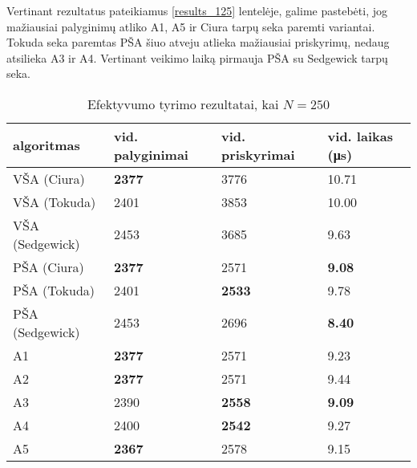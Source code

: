 \documentclass{VUMIFInfKursinis}
\begin{document}
Vertinant rezultatus pateikiamus \ref{results_125} lentelėje, galime pastebėti, jog
mažiausiai palyginimų atliko A1, A5 ir Ciura tarpų seka paremti variantai.
Tokuda seka paremtas PŠA šiuo atveju atlieka mažiausiai priskyrimų, nedaug atsilieka A3 ir A4.
Vertinant veikimo laiką pirmauja PŠA su Sedgewick tarpų seka.


\begin{table}[H]
  \caption{Efektyvumo tyrimo rezultatai, kai $N = 250$}
  \label{results_250}
  \centering
  \begin{tabular}{@{}llll@{}}
  algoritmas & vid. palyginimai                      & vid. priskyrimai                      & vid. laikas (μs)                      \\ \midrule
  VŠA (Ciura)       & \cellcolor[HTML]{70AD47}\textbf{2377} & 3776                                  & 10.71                                 \\
  VŠA (Tokuda)      & 2401                                  & 3853                                  & 10.00                                 \\
  VŠA (Sedgewick)       & 2453                                  & 3685                                  & 9.63                                  \\
  PŠA (Ciura)      & \cellcolor[HTML]{70AD47}\textbf{2377} & 2571                                  & \cellcolor[HTML]{70AD47}\textbf{9.08} \\
  PŠA (Tokuda)      & 2401                                  & \cellcolor[HTML]{70AD47}\textbf{2533} & 9.78                                  \\
  PŠA (Sedgewick)      & 2453                                  & 2696                                  & \cellcolor[HTML]{70AD47}\textbf{8.40} \\
  A1      & \cellcolor[HTML]{70AD47}\textbf{2377} & 2571                                  & 9.23                                  \\
  A2      & \cellcolor[HTML]{70AD47}\textbf{2377} & 2571                                  & 9.44                                  \\
  A3      & 2390                                  & \cellcolor[HTML]{70AD47}\textbf{2558} & \cellcolor[HTML]{70AD47}\textbf{9.09} \\
  A4      & 2400                                  & \cellcolor[HTML]{70AD47}\textbf{2542} & 9.27                                  \\
  A5      & \cellcolor[HTML]{70AD47}\textbf{2367} & 2578                                  & 9.15                                  \\ \bottomrule 
  \end{tabular}
\end{table}
\end{document}
